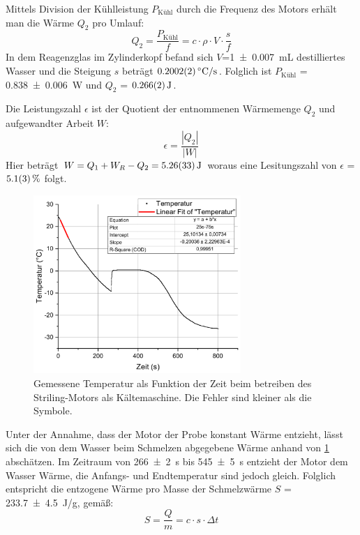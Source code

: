 \documentclass[
	a4paper,
	12pt,
	pagesize,
	ngerman
]{scrartcl}
\begin{document}
	Mittels Division der Kühlleistung $P_\text{Kühl}$ durch die Frequenz des Motors erhält man die Wärme $Q_2$ pro Umlauf:
	\begin{equation}
	Q_2 = \frac{P_\text{Kühl}}{f} = c \cdot \rho \cdot V \cdot \frac{s}{f}	
	\end{equation}
	In dem Reagenzglas im Zylinderkopf befand sich $V$=\SI{1+- 0,007}{mL} destilliertes Wasser und die Steigung $s$ beträgt $\SI{0,2002+-0,0002}{\degreeCelsius/s}$. %
	Folglich ist $P_\text{Kühl}$ = \SI{0,838+-0,006}{W} und $Q_2$ = $\SI{0,266+-0,002}{J}$.
	
	Die Leistungszahl $\epsilon$ ist der Quotient der entnommenen Wärmemenge $Q_2$ und aufgewandter Arbeit $W$:
	\begin{equation}
		\epsilon = \frac{|Q_2|}{|W|}
		\label{eq_Leistungszahl}
	\end{equation}
	Hier beträgt $W=Q_1+W_R-Q_2=\SI{5,26+-0,33}{J}$ woraus eine Lesitungszahl von $\epsilon$ = $\SI{5,1 +- 0,3}{\%}$ folgt.
	
	\begin{figure}[H]
		\includegraphics[width=0.7\textwidth]{Kuehl}
		\centering
		\caption{Gemessene Temperatur als Funktion der Zeit beim betreiben des Striling-Motors als Kältemaschine. Die Fehler sind kleiner als die Symbole.}
		\label{fig_Kuehl}
		\centering
	\end{figure}

	Unter der Annahme, dass der Motor der Probe konstant Wärme entzieht, lässt sich die von dem Wasser beim Schmelzen abgegebene Wärme anhand von \cref{fig_Kuehl} abschätzen.
	Im Zeitraum von \SI{266+-2}{s} bis \SI{545+-5}{s} entzieht der Motor dem Wasser Wärme, die Anfangs- und Endtemperatur sind jedoch gleich. 
	Folglich entspricht die entzogene Wärme pro Masse der Schmelzwärme $S$ = \SI{233,7+-4.5}{J/g}, gemäß:
	\begin{equation}
	S = \frac{Q}{m} = c \cdot s\cdot \Delta{t}
	\end{equation}
	
\end{document}
